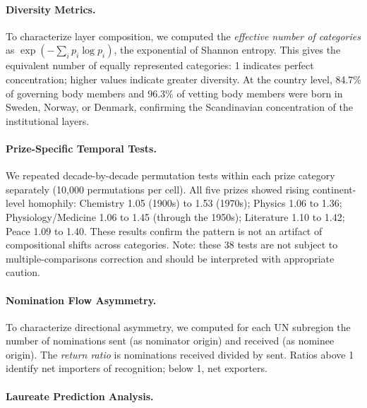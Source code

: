\documentclass[12pt]{article}
\begin{document}
\paragraph*{Diversity Metrics.}

To characterize layer composition, we computed the \emph{effective number of categories} as $\exp(-\sum_i p_i \log p_i)$, the exponential of Shannon entropy. This gives the equivalent number of equally represented categories: 1 indicates perfect concentration; higher values indicate greater diversity. At the country level, 84.7\% of governing body members and 96.3\% of vetting body members were born in Sweden, Norway, or Denmark, confirming the Scandinavian concentration of the institutional layers.

\paragraph*{Prize-Specific Temporal Tests.}

We repeated decade-by-decade permutation tests within each prize category separately (10,000 permutations per cell). All five prizes showed rising continent-level homophily: Chemistry 1.05 (1900s) to 1.53 (1970s); Physics 1.06 to 1.36; Physiology/Medicine 1.06 to 1.45 (through the 1950s); Literature 1.10 to 1.42; Peace 1.09 to 1.40. These results confirm the pattern is not an artifact of compositional shifts across categories. Note: these 38 tests are not subject to multiple-comparisons correction and should be interpreted with appropriate caution.

\paragraph*{Nomination Flow Asymmetry.}

To characterize directional asymmetry, we computed for each UN subregion the number of nominations sent (as nominator origin) and received (as nominee origin). The \emph{return ratio} is nominations received divided by sent. Ratios above 1 identify net importers of recognition; below 1, net exporters.

\paragraph*{Laureate Prediction Analysis.}
\end{document}

